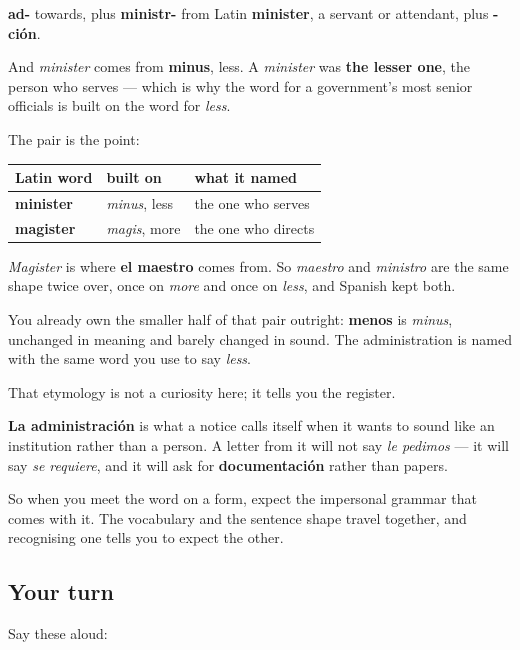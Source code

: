 \begin{cousinweb}
\textbf{ad-} towards, plus \textbf{ministr-} from Latin \textbf{minister}, a servant or attendant, plus \textbf{-ción}.

And \emph{minister} comes from \textbf{minus}, less. A \emph{minister} was \textbf{the lesser one}, the person who serves — which is why the word for a government's most senior officials is built on the word for \emph{less}.

The pair is the point:

\noindent
\begin{tabularx}{\linewidth}{@{}>{\raggedright\arraybackslash}X>{\raggedright\arraybackslash}X>{\raggedright\arraybackslash}X@{}}
\toprule
\textbf{Latin word} & \textbf{built on} & \textbf{what it named} \\
\midrule
\textbf{minister} & \emph{minus}, less & the one who serves \\
\textbf{magister} & \emph{magis}, more & the one who directs \\
\bottomrule
\end{tabularx}

\emph{Magister} is where \textbf{el maestro} comes from. So \emph{maestro} and \emph{ministro} are the same shape twice over, once on \emph{more} and once on \emph{less}, and Spanish kept both.

You already own the smaller half of that pair outright: \textbf{menos} is \emph{minus}, unchanged in meaning and barely changed in sound. The administration is named with the same word you use to say \emph{less}.
\end{cousinweb}

\begin{culture}
That etymology is not a curiosity here; it tells you the register.

\textbf{La administración} is what a notice calls itself when it wants to sound like an institution rather than a person. A letter from it will not say \emph{le pedimos} — it will say \emph{se requiere}, and it will ask for \textbf{documentación} rather than papers.

So when you meet the word on a form, expect the impersonal grammar that comes with it. The vocabulary and the sentence shape travel together, and recognising one tells you to expect the other.
\end{culture}

\subsection*{Your turn}
Say these aloud:

